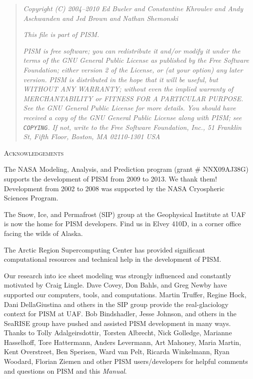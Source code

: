 \documentclass[titlepage,letterpaper,final]{scrartcl}
\newcommand{\normalspacing}{\renewcommand{\baselinestretch}{1.1}\tiny\normalsize}
\begin{document}
\phantom{bob}
\vspace{1.0in}
\begin{quote}
\textsl{Copyright (C) 2004--2010 Ed Bueler and Constantine Khroulev and Andy Aschwanden and Jed Brown and Nathan Shemonski}
\medskip

\noindent \textsl{This file is part of PISM.}
\medskip

\noindent \textsl{PISM is free software; you can redistribute it and/or modify it under the terms of the GNU General Public License as published by the Free Software Foundation; either version 2 of the License, or (at your option) any later version.  PISM is distributed in the hope that it will be useful, but WITHOUT ANY WARRANTY; without even the implied warranty of MERCHANTABILITY or FITNESS FOR A PARTICULAR PURPOSE.  See the GNU General Public License for more details.  You should have received a copy of the GNU General Public License along with PISM; see \emph{\texttt{COPYING}}.  If not, write to the Free Software Foundation, Inc., 51 Franklin St, Fifth Floor, Boston, MA  02110-1301 USA}
\end{quote}
\vspace{0.6in}
\normalspacing


\centerline{\textsc{Acknowledgements}}
\bigskip

\small
The NASA Modeling, Analysis, and Prediction program (grant \# NNX09AJ38G) supports the development of PISM from 2009 to 2013.  We thank them!  Development from 2002 to 2008 was supported by the NASA Cryospheric Sciences Program.

The Snow, Ice, and Permafrost (SIP) group at the Geophysical Institute at UAF is now the home for PISM developers.  Find us in Elvey 410D, in a corner office facing the wilds of Alaska.

The Arctic Region Supercomputing Center has provided significant computational resources and technical help in the development of PISM.

Our research into ice sheet modeling was strongly influenced and constantly motivated by Craig Lingle.  Dave Covey, Don Bahls, and Greg Newby have supported our computers, tools, and computations.  Martin Truffer, Regine Hock, Dani DellaGiustina and others in the SIP group provide the real-glaciology context for PISM at UAF.  Bob Bindshadler, Jesse Johnson, and others in the SeaRISE group have pushed and assisted PISM development in many ways.  Thanks to Tolly Adalgeirsdottir, Torsten Albrecht, Nick Golledge, Marianne Hasselhoff, Tore Hattermann, Anders Levermann, Art Mahoney, Maria Martin, Kent Overstreet, Ben Sperisen, Ward van Pelt, Ricarda Winkelmann, Ryan Woodard, Florian Ziemen and other PISM users/developers for helpful comments and questions on PISM and this \emph{Manual}.
\normalsize
\end{document}
